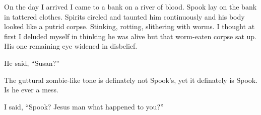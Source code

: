  On the day I arrived I came to a bank on a river of blood. Spook lay on the bank in tattered clothes. Spirits circled and taunted him continuously and his body looked like a putrid corpse. Stinking, rotting, slithering with worms. I thought at first I deluded myself in thinking he was alive but that worm-eaten corpse sat up. His one remaining eye widened in disbelief.
 
 He said, ``Susan?''
 
 The guttural zombie-like tone is definately not Spook's, yet it definately is Spook. Is he ever a mess.
 
 I said, ``Spook? Jesus man what happened to you?''
 
  
 
 























